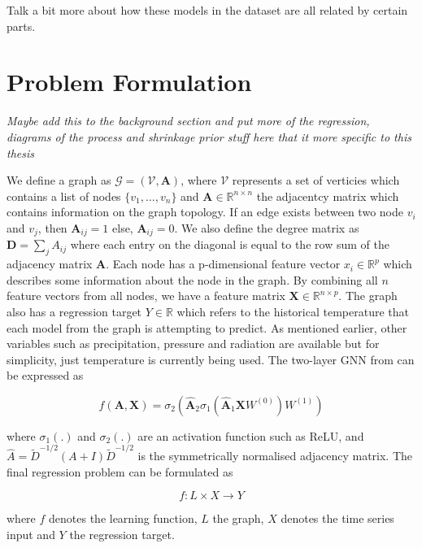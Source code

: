 \documentclass[honours,12pt]{unswthesis}
\numberwithin{equation}{section}
\begin{document}
Talk a bit more about how these models in the dataset are all related by certain parts.

{\section{Problem Formulation}}\label{problem-formulation}
\textit{Maybe add this to the background section and put more of the regression, diagrams of the process and shrinkage prior stuff here that it more specific to this thesis}

We define a graph as ${\mathcal{G}} = ({\mathcal{V}}, \textbf{A})$, where $\mathcal{V}$ represents a set of verticies which contains a list of nodes
$\{ v_1, \dots, v_n \}$ and $\textbf{A} \in \mathbb{R}^{n \times n}$ the adjacentcy matrix which contains information on the graph topology. If an edge exists
between two node $v_i$ and $v_j$, then $\textbf{A}_{ij} = 1$ else, $\textbf{A}_{ij} = 0$. We also define the degree matrix as $\mathbf{D} = \sum_{j}A_{ij}$
where each entry on the diagonal is equal to the row sum of the adjacency matrix $\textbf{A}$.  
Each node has a {p}-dimensional feature vector ${x_i} \in \mathbb{R}^{p}$
which describes some information about the node in the graph. By combining all ${n}$ feature vectors from all nodes, we have a feature matrix
$\textbf{X} \in \mathbb{R}^{n\times p}$. The graph also has a regression target ${Y} \in \mathbb{R}$ which refers to the historical temperature that each model from the
graph is attempting to predict. As mentioned earlier, other variables such as precipitation, pressure and radiation are available but for simplicity, just temperature
is currently being used. The two-layer GNN from \cite{kipf2017semisupervised} can be expressed as

\begin{equation}
f(\mathbf{A, X}) = \sigma_2( \mathbf{ \hat{A} }_2 \sigma_1 (\mathbf{ \hat{A} }_1 \mathbf{X} W^{(0)}) W^{(1)})
\end{equation}

\noindent where $\sigma_1(.)$ and $\sigma_2(.)$ are an activation function such as ReLU, and $\hat{A} = \tilde{D}^{-1/2} (A + I) \tilde{D}^{-1/2}$
is the symmetrically normalised adjacency matrix. The final regression problem can be formulated as

\begin{equation}
f : L \times X \rightarrow Y
\end{equation}

\noindent where $f$ denotes the learning function, $L$ the graph, $X$ denotes the time series input and $Y$ the regression target.
\end{document}

